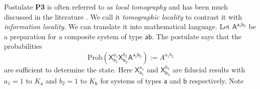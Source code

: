 \documentclass[10pt]{article}
\begin{document}
Postulate {\bf P3} is often referred to as \emph{local tomography} and has been much discussed in the literature \cite{araki1980characterization, bergia1980actual, wootters1990local, mermin1998quantum}. We call it \emph{tomographic locality} to contrast it with \emph{information locality}.  We can translate it into mathematical language.  Let $\mathsf{A^{a_1b_2}}$ be a preparation for a composite system of type $\mathsf{ab}$.  The postulate says that the probabilities
\begin{equation}\label{jointprobs}
\text{Prob}(\mathsf{X}_\mathsf{{a_1}}^{a_1} \mathsf{X}_\mathsf{{b_2}}^{b_2} \mathsf{A^{a_1b_2}}) := A^{a_1b_2}
\end{equation}
are sufficient to determine the state. Here $\mathsf{X}_\mathsf{{a_1}}^{a_1}$ and $\mathsf{X}_\mathsf{{b_2}}^{b_2}$ are fiducial results with $a_1=1$ to $K_\mathsf{a}$ and $b_2=1$ to $K_\mathsf{b}$ for systems of types $\mathsf a$ and $\mathsf b$ respectively.  Note
\end{document}
